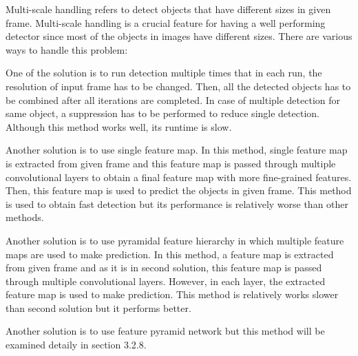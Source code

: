 \documentclass{article}
\begin{document}
\setlength{\parindent}{6ex}

\indent

Multi-scale handling refers to detect objects that have different 
sizes in given frame. Multi-scale handling is a crucial feature for 
having a well performing detector since most of the objects in images
have different sizes. There are various ways to handle this problem: \par

One of the solution is to run detection multiple times that in each 
run, the resolution of input frame has to be changed. Then, all the 
detected objects has to be combined after all iterations are completed. 
In case of multiple detection for same object, a suppression has to be 
performed to reduce single detection. Although this method works well, 
its runtime is slow. \par

Another solution is to use single feature map. In this method, single 
feature map is extracted from given frame and this feature map is passed 
through multiple convolutional layers to obtain a final feature map with 
more fine-grained features. Then, this feature map is used to predict the 
objects in given frame. This method is used to obtain fast detection but 
its performance is relatively worse than other methods. \par

Another solution is to use pyramidal feature hierarchy in which multiple 
feature maps are used to make prediction. In this method, a feature map 
is extracted from given frame and as it is in second solution, this 
feature map is passed through multiple convolutional layers. However, 
in each layer, the extracted feature map is used to make prediction. This 
method is relatively works slower than second solution but it performs better. \par

Another solution is to use feature pyramid network but this method will be 
examined detaily in section 3.2.8. 
\end{document}
